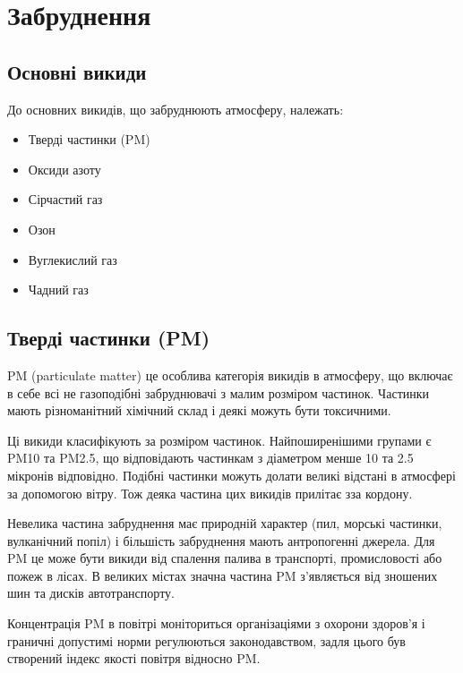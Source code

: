 \chapter{Забруднення}

\section{Основні викиди}

До основних викидів, що забруднюють атмосферу, належать:
\begin{itemize}
    \item Тверді частинки (PM)
    \item Оксиди азоту
    \item Сірчастий газ
    \item Озон
    \item Вуглекислий газ
    \item Чадний газ
\end{itemize}

\section{Тверді частинки (PM)}

PM (particulate matter) це особлива категорія викидів в атмосферу, що включає в себе всі не газоподібні забруднювачі 
з малим розміром частинок. Частинки мають різноманітний хімічний склад і деякі можуть бути 
токсичними. 

Ці викиди класифікують за розміром частинок. Найпоширенішими групами є PM10 та PM2.5, 
що відповідають частинкам з діаметром менше 10 та 2.5 мікронів відповідно. 
Подібні частинки можуть долати великі відстані в атмосфері за допомогою вітру. 
Тож деяка частина цих викидів прилітає зза кордону. 

Невелика частина забруднення має природній характер (пил, морські частинки, вулканічний попіл) і більшість забруднення мають антропогенні джерела. 
Для PM це може бути викиди від спалення палива в транспорті, промисловості або пожеж в лісах. 
В великих містах значна частина PM з'являється від зношених шин та дисків автотранспорту.

Концентрація PM в повітрі моніториться організаціями з охорони здоров'я і граничні 
допустимі норми регулюються законодавством, задля цього був створений індекс якості повітря 
відносно PM.\cite{noauthor__nodate}

